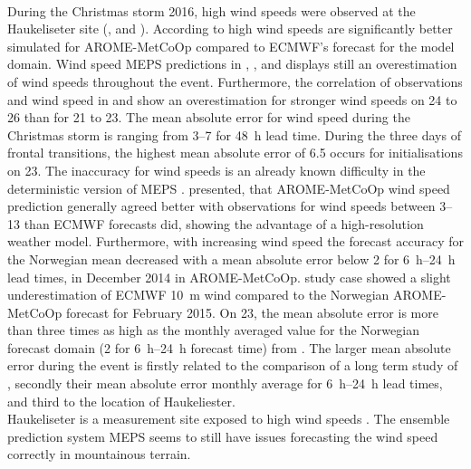 \noindent
\\
During the Christmas storm 2016, high wind speeds were observed at the Haukeliseter site (,   and ).
According to \citet{muller_arome-metcoop:_2017} high wind speeds are significantly better simulated for AROME-MetCoOp compared to ECMWF's forecast for the model domain. Wind speed MEPS predictions in , , and  displays still an overestimation of wind speeds throughout the event. Furthermore, the correlation of observations and wind speed in  and  show an overestimation for stronger wind speeds on \num{24} to \SI{26}{\dec} than for \num{21} to \SI{23}{\dec}. 
The mean absolute error for wind speed during the Christmas storm is ranging from \SIrange{3}{7}{\mPs} for \SI{48}{\hour} lead time.
During the three days of frontal transitions, the highest mean absolute error of \SI{6.5}{\mPs} occurs for initialisations on \SI{23}{\dec}.
The inaccuracy for wind speeds is an already known difficulty in the deterministic version of MEPS \citep{muller_arome-metcoop:_2017}. \citet{muller_arome-metcoop:_2017} presented, that AROME-MetCoOp wind speed prediction generally agreed better with observations for wind speeds between \SIrange{3}{13}{\mPs} than ECMWF forecasts did, showing the advantage of a high-resolution weather model. Furthermore, with increasing wind speed the forecast accuracy for the Norwegian mean decreased with a mean absolute error below \SI{2}{\mPs} for \SIrange{6}{24}{\hour} lead times, in December 2014 in AROME-MetCoOp. \citet{muller_arome-metcoop:_2017} study case showed a slight underestimation of ECMWF \SI{10}{\metre} wind compared to the Norwegian AROME-MetCoOp forecast for February 2015.%
On \SI{23}{\dec}, the mean absolute error is more than three times as high as the monthly averaged value for the Norwegian forecast domain (\SI{2}{\mPs} for \SIrange{6}{24}{\hour} forecast time) from \citet{muller_arome-metcoop:_2017}. The larger mean absolute error during the event is firstly related to the comparison of a long term study of \citet{muller_arome-metcoop:_2017}, secondly their mean absolute error monthly average for \SIrange{6}{24}{\hour} lead times, and third to the location of Haukeliester. 
\\
Haukeliseter is a measurement site exposed to high wind speeds \citep{wolff_measurements_2013,wolff_derivation_2015}. The ensemble prediction system MEPS seems to still have issues forecasting the wind speed correctly in mountainous terrain.
